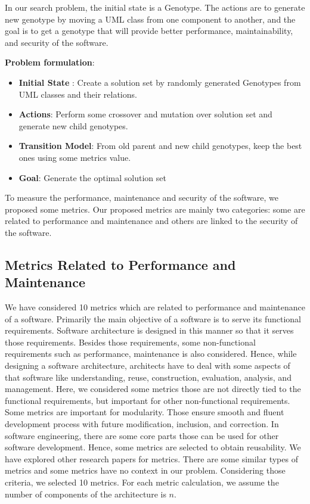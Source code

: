 \documentclass[letterpaper, 10 pt, conference]{ieeeconf}  %
\begin{document}


In our search problem, the initial state is a Genotype. The actions are to generate new genotype by moving a UML class from one component to another, and the goal is to get a genotype that will provide better performance, maintainability, and security of the software.

\textbf{Problem formulation}:
\begin{itemize}
\item \textbf{Initial State} : Create a solution set by randomly generated Genotypes from UML classes and their relations.

\item\textbf{Actions}: Perform some crossover and mutation over  
solution set and generate new child genotypes.
\item \textbf{Transition Model}: From old parent and new child genotypes, keep the best ones using some metrics value.
\item \textbf{Goal}: Generate the optimal solution set

\end{itemize}


To measure the performance, maintenance and security of the software, we proposed some metrics. Our proposed metrics are mainly two categories: some are related to performance and maintenance and others are linked to the security of the software.


\subsection{Metrics Related to Performance and Maintenance}
We have considered  10 metrics which are related to performance and maintenance of a software. Primarily the main objective of a software is to serve its functional requirements. Software architecture is designed in this manner so that it serves those requirements. Besides those requirements, some non-functional requirements such as performance, maintenance is also considered. Hence, while designing a software architecture, architects have to deal with some aspects of that software like understanding, reuse, construction, evaluation, analysis, and management\cite{garlan2000software}. Here, we considered some metrics those are not directly tied to the functional requirements, but important for other non-functional requirements. Some metrics are important for modularity. Those ensure smooth and fluent development process with future modification, inclusion, and correction. 
In software engineering, there are some core parts those can be used for other software development. Hence, some metrics are selected to obtain reusability.
We have explored other research papers for metrics. There are some similar types of metrics and some metrics have no context in our problem. Considering those criteria, we selected 10 metrics.
 \newline
For each metric calculation,  we assume the number of components of the architecture is $n$. 
\end{document}
